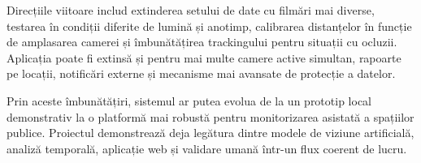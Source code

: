 Direcțiile viitoare includ extinderea setului de date cu filmări mai diverse, testarea în condiții diferite de lumină și anotimp, calibrarea distanțelor în funcție de amplasarea camerei și îmbunătățirea trackingului pentru situații cu ocluzii. Aplicația poate fi extinsă și pentru mai multe camere active simultan, rapoarte pe locații, notificări externe și mecanisme mai avansate de protecție a datelor.

Prin aceste îmbunătățiri, sistemul ar putea evolua de la un prototip local demonstrativ la o platformă mai robustă pentru monitorizarea asistată a spațiilor publice. Proiectul demonstrează deja legătura dintre modele de viziune artificială, analiză temporală, aplicație web și validare umană într-un flux coerent de lucru.
